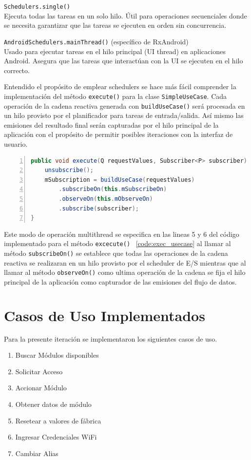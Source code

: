 \texttt{Schedulers.single()}\\
Ejecuta todas las tareas en un solo hilo.
Útil para operaciones secuenciales donde se necesita garantizar que las tareas se ejecuten en orden sin concurrencia.

\texttt{AndroidSchedulers.mainThread()} (específico de RxAndroid)\\
Usado para ejecutar tareas en el hilo principal (UI thread) en aplicaciones Android.
Asegura que las tareas que interactúan con la UI se ejecuten en el hilo correcto.


Entendido el propósito de emplear schedulers se hace más fácil comprender la implementación del método \texttt{execute()} para la clase \texttt{SimpleUseCase}.
Cada operación de la cadena reactiva generada con \texttt{buildUseCase()} será procesada en un hilo provisto por el planificador para tareas de entrada/salida.
Así mismo las emisiones del resultado final serán capturadas por el hilo principal de la aplicación con el propósito de permitir posibles iteraciones con 
la interfaz de usuario. 

\begin{lstlisting}[caption={Método execute SimpleUseCase}, label={code:exec_usecase}, language=java, basicstyle=\ttfamily \footnotesize, numbers=left, stepnumber=1, showstringspaces=false, float]
public void execute(Q requestValues, Subscriber<P> subscriber) {
	unsubscribe();
	mSubscription = buildUseCase(requestValues)
		.subscribeOn(this.mSubscribeOn)
		.observeOn(this.mObserveOn)
		.subscribe(subscriber);
}
\end{lstlisting}

Este modo de operación multithread se especifica en las lineas 5 y 6 del código implementado para el método \texttt{excecute()} ~\ref{code:exec_usecase}
al llamar al método \texttt{subscribeOn()} se establece que todas las operaciones de la cadena reactiva se realizaran en un hilo provisto por el scheduler de E/S mientras que al llamar al método \texttt{observeOn()} como ultima operación de la cadena se fija el hilo principal de la aplicación como capturador de las emisiones del flujo de datos.

\section{Casos de Uso Implementados}
Para la presente iteración se implementaron los siguientes casos de uso.
\begin{enumerate}
	\item Buscar Módulos disponibles
	\item Solicitar Acceso
	\item Accionar Módulo
	\item Obtener datos de módulo
	\item Resetear a valores de fábrica
	\item Ingresar Credenciales WiFi
	\item Cambiar Alias	
\end{enumerate}

